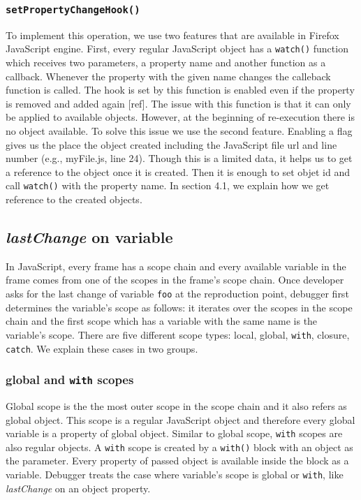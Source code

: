 \documentclass[preprint]{sigplanconf}
\begin{document}
\subsubsection{\texttt{setPropertyChangeHook()}}
To implement this operation, we use two features that are available in Firefox JavaScript engine. First, every regular JavaScript object has a \texttt{watch()} function which receives two parameters, a property name and another function as a callback. Whenever the property with the given name changes the calleback function is called. The hook is set by this function is enabled even if the property is removed and added again [ref]. The issue with this function is that it can only be applied to available objects. However, at the beginning of re-execution there is no object available. To solve this issue we use the second feature. Enabling a flag gives us the place the object created including the JavaScript file url and line number (e.g., myFile.js, line 24). Though this is a limited data, it helps us to get a reference to the object once it is created. Then it is enough to set objet id and call \texttt{watch()} with the property name. In section 4.1, we explain how we get reference to the created objects.
 
\subsection{\textit{lastChange} on variable} 
In JavaScript, every frame has a scope chain and every available variable in the frame comes from one of the scopes in the frame's scope chain. Once developer asks for the last change of variable \texttt{foo} at the reproduction point, debugger first determines the variable's scope as follows: it iterates over the scopes in the scope chain and the first scope which has a variable with the same name is the variable's scope. There are five different scope types: local, global, \texttt{with}, closure, \texttt{catch}. We explain these cases in two groups.


\subsubsection{global and \texttt{with} scopes}
Global scope is the the most outer scope in the scope chain and it also refers as global object. This scope is a regular JavaScript object and therefore every global variable is a property of global object. Similar to global scope, \texttt{with} scopes are also regular objects. A \texttt{with} scope is created by a \texttt{with()} block with an object as the parameter. Every property of passed object is available inside the block as a variable. Debugger treats the case where variable's scope is global or \texttt{with}, like \textit{lastChange} on an object property. 
\end{document}
